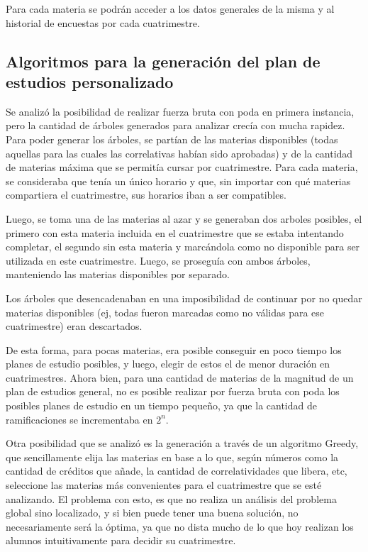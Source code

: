 \documentclass[a4paper]{article}
\begin{document}
Para cada materia se podrán acceder a los datos generales de la misma y al historial de encuestas por cada cuatrimestre.

\subsection{Algoritmos para la generación del plan de estudios personalizado}

	Se analizó la posibilidad de realizar fuerza bruta con poda en primera instancia, pero la cantidad de árboles generados para analizar crecía con mucha rapidez.
Para poder generar los árboles, se partían de las materias disponibles (todas aquellas para las cuales las correlativas habían sido aprobadas) y de la cantidad de materias máxima que se permitía cursar por cuatrimestre. Para cada materia, se consideraba que tenía un único horario y que, sin importar con qué materias compartiera el cuatrimestre, sus horarios iban a ser compatibles.

Luego, se toma una de las materias al azar y se generaban dos arboles posibles, el primero con esta materia incluida en el cuatrimestre que se estaba intentando completar, el segundo sin esta materia y marcándola como no disponible para ser utilizada en este cuatrimestre. Luego, se proseguía con ambos árboles, manteniendo las materias disponibles por separado.

Los árboles que desencadenaban en una imposibilidad de continuar por no quedar materias disponibles (ej, todas fueron marcadas como no válidas para ese cuatrimestre) eran descartados.

De esta forma, para pocas materias, era posible conseguir en poco tiempo los planes de estudio posibles, y luego, elegir de estos el de menor duración en cuatrimestres. Ahora bien, para una cantidad de materias de la magnitud de un plan de estudios general, no es posible realizar por fuerza bruta con poda los posibles planes de estudio en un tiempo pequeño, ya que la cantidad de ramificaciones se incrementaba en $2^{n}$.\newline


Otra posibilidad que se analizó es la generación a través de un algoritmo Greedy, que sencillamente elija las materias en base a lo que, según números como la cantidad de créditos que añade, la cantidad de correlatividades que libera, etc, seleccione las materias más convenientes para el cuatrimestre que se esté analizando. El problema con esto, es que no realiza un análisis del problema global sino localizado, y si bien puede tener una buena solución, no necesariamente será la óptima, ya que no dista mucho de lo que hoy realizan los alumnos intuitivamente para decidir su cuatrimestre.\newline
\end{document}
